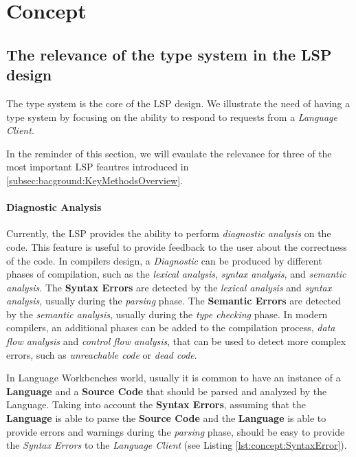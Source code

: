 \chapter{Concept}\label{chap:Concept}

\section{The relevance of the type system in the LSP design}\label{sec:concept:RelevanceOfTheTypeSystem}

The type system is the core of the LSP design. We illustrate the need of having a type system by focusing on the ability to respond to requests from a \textit{Language Client}.

In the reminder of this section, we will evaulate the relevance for three of the most important LSP feautres introduced in \ref{subsec:bacground:KeyMethodsOverview}.

\subsubsection{Diagnostic Analysis}\label{subsubsec:concept:DiagnosticAnalysis}

Currently, the LSP provides the ability to perform \textit{diagnostic analysis} on the code. This feature is useful to provide feedback to the user about the correctness of the code.
In compilers design, a \textit{Diagnostic} can be produced by different phases of compilation, such as the \textit{lexical analysis}, \textit{syntax analysis}, and \textit{semantic analysis}.
The \textbf{Syntax Errors} are detected by the \textit{lexical analysis} and \textit{syntax analysis}, usually during the \textit{parsing} phase. The \textbf{Semantic Errors} are detected by the \textit{semantic analysis}, usually during the \textit{type checking} phase.
In modern compilers, an additional phases can be added to the compilation process, \textit{data flow analysis} and \textit{control flow analysis}, that can be used to detect more complex errors, such as \textit{unreachable code} or \textit{dead code}.

In Language Workbenches world, usually it is common to have an instance of a \textbf{Language} and a \textbf{Source Code} that should be parsed and analyzed by the Language.
Taking into account the \textbf{Syntax Errors}, assuming that the \textbf{Language} is able to parse the \textbf{Source Code} and the \textbf{Language} is able to provide errors and warnings during the \textit{parsing} phase, should be easy to provide the \textit{Syntax Errors} to the \textit{Language Client} (see Listing \ref{lst:concept:SyntaxError}).

